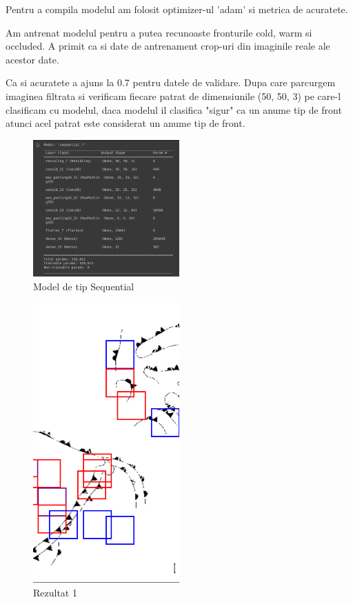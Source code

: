 \documentclass{article}
\begin{document}
Pentru a compila modelul am folosit optimizer-ul 'adam' si metrica de acuratete.

Am antrenat modelul pentru a putea recunoaste fronturile cold, warm si occluded.
A primit ca si date de antrenament crop-uri din imaginile reale ale acestor date.

Ca si acuratete a ajuns la 0.7 pentru datele de validare.
Dupa care parcurgem imaginea filtrata si verificam fiecare patrat de dimensiunile (50, 50, 3) pe care-l clasificam cu modelul, daca modelul il clasifica "sigur" ca un anume tip de front atunci acel patrat este considerat un anume tip de front.
    
\begin{figure}[h]
\centering
\includegraphics[width=0.5\textwidth]{model1.jpg}
\caption{\label{fig:3}Model de tip Sequential}
\end{figure}

\begin{figure}[h]
\centering
\includegraphics[width=0.5\textwidth]{result1.jpg}
\caption{\label{fig:4}Rezultat 1}
\end{figure}
\end{document}
